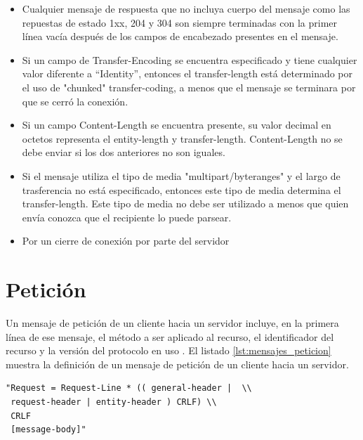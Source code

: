 \begin{description}
\begin{itemize}
\item Cualquier mensaje de respuesta que no incluya cuerpo del mensaje como las repuestas de estado 1xx, 204 y 304 son siempre terminadas con la primer línea vacía después de los campos de encabezado presentes en el mensaje.
\item Si un campo de Transfer-Encoding se encuentra especificado y tiene cualquier valor diferente a “Identity”, entonces el transfer-length está determinado por el uso de "chunked" transfer-coding, a menos que el mensaje se terminara por que se cerró la conexión.
\item Si un campo Content-Length se encuentra presente, su valor decimal en octetos representa el entity-length y transfer-length. Content-Length no se debe enviar si los dos anteriores no son iguales. 
\item Si el mensaje utiliza el tipo de media "multipart/byteranges" y el largo de trasferencia no está especificado, entonces este tipo de media determina el transfer-length. Este tipo de media no debe ser utilizado a menos que quien envía conozca que el recipiente lo puede parsear.
\item Por un cierre de conexión por parte del servidor

\end{itemize}


\end{description}

\section{Petición}
Un mensaje de petición de un cliente hacia un servidor incluye, en la primera línea de ese mensaje, el método a ser aplicado al recurso, el identificador del recurso y la versión del protocolo en uso \cite{rfc2616}. El listado \ref{lst:mensajes_peticion} muestra la definición de un mensaje de petición de un cliente hacia un servidor. 


\begin{lstlisting}[caption={Mensaje de petición},label={lst:mensajes_peticion}]
"Request = Request-Line * (( general-header |  \\
 request-header | entity-header ) CRLF) \\  
 CRLF
 [message-body]"
\end{lstlisting}

